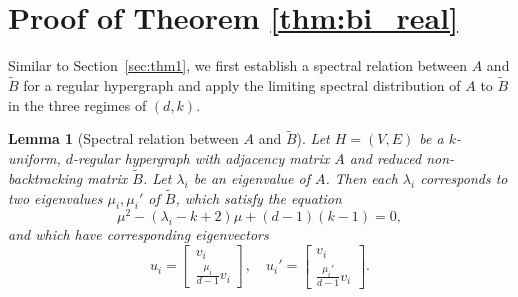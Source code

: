 \documentclass[11pt,reqno]{amsart}
\newtheorem{lemma}[theorem]{Lemma}
\theoremstyle{definition}
\begin{document}
 
\section{Proof of Theorem \ref{thm:bi_real}}

{Similar to Section~\ref{sec:thm1}, we first establish a spectral relation between $A$ and $\tilde B$ for a regular hypergraph and apply the limiting spectral distribution of $A$ to $\tilde B$ in the three regimes of $(d,k)$.}

\begin{lemma}[Spectral relation between $A$ and $\tilde B$]\label{lem:bi_eigenvalues}
Let $H = (V, E)$ be a $k$-uniform, $d$-regular hypergraph with adjacency matrix $A$ and reduced  non-backtracking matrix $\tilde B$. Let $\lambda_i$ be an eigenvalue of $A$. Then each $\lambda_i$ corresponds to two eigenvalues $\mu_{i},\mu_i'$ of $\tilde B$, which satisfy the equation
\begin{equation}\label{eq:bi_mu}
    \mu^2 - (\lambda_i-k+2 )\mu + (d-1)(k-1) = 0,
\end{equation}
and {which} have corresponding eigenvectors 
\begin{equation}\label{eq:bi_eigenvector_H}
u_i = 
    \begin{bmatrix}
v_i\\
 \frac{\mu_i}{d-1} v_i
\end{bmatrix}  ,\quad u_i' = 
    \begin{bmatrix}
v_i\\
 \frac{\mu_i'}{d-1} v_i
\end{bmatrix} .
\end{equation}
\end{lemma}
\end{document}
